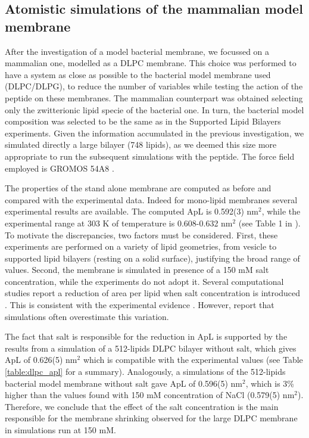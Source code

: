 \subsection{Atomistic simulations of the mammalian model membrane} \label{sec:lip_atom_mamm}

After the investigation of a model bacterial membrane, we focussed on a mammalian one, modelled as a DLPC membrane. This choice was performed to have a system as close as possible to the bacterial model membrane used (DLPC/DLPG), to reduce the number of variables while testing the action of the peptide on these membranes. The mammalian counterpart was obtained selecting only the zwitterionic lipid specie of the bacterial one. In turn, the bacterial model composition was selected to be the same as in the Supported Lipid Bilayers experiments.
%
Given the information accumulated in the previous investigation, we simulated directly a large bilayer (748 lipids), as we deemed this size more appropriate to run the subsequent simulations with the peptide. The force field employed is GROMOS 54A8 \citep{Reif2012}.

The properties of the stand alone membrane are computed as before and compared with the experimental data. Indeed for mono-lipid membranes several experimental results are available. The computed ApL is 0.592(3) nm$^2$, while the experimental range at 303 K of temperature is 0.608-0.632 nm$^2$ (see Table 1 in \citet{Poger2016}). To motivate the discrepancies, two factors must be considered. First, these experiments are performed on a variety of lipid geometries, from vesicle to supported lipid bilayers (resting on a solid surface), justifying the broad range of values. Second, the membrane is simulated in presence of a 150 mM salt concentration, while the experiments do not adopt it. Several computational studies report a reduction of area per lipid when salt concentration is introduced \citep{Bockmann2003,Jarerattanachat2013,Reif2017}. This is consistent with the experimental evidence \citep{Pabst2007}. However, \citet{Reif2017} report that simulations often overestimate this variation.

The fact that salt is responsible for the reduction in ApL is supported by the results from a simulation of a 512-lipids DLPC bilayer without salt, which gives ApL of 0.626(5) nm$^2$ which is compatible with the experimental values (see Table \ref{table:dlpc_apl} for a summary). Analogously, a simulations of the 512-lipids bacterial model membrane without salt gave ApL of 0.596(5) nm$^2$, which is 3\% higher than the values found with 150 mM concentration of NaCl (0.579(5) nm$^2$).
%
Therefore, we conclude that the effect of the salt concentration is the main responsible for the membrane shrinking observed for the large DLPC membrane in simulations run at 150 mM.

